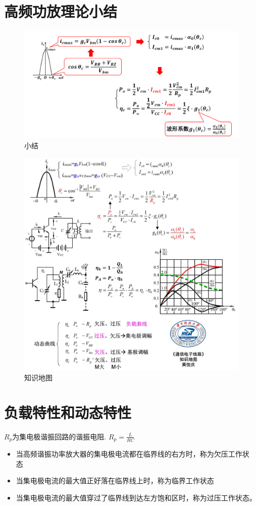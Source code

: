 \documentclass[a4paper]{report}
\begin{document}
\section{高频功放理论小结}
\begin{figure}[H]
\centering
\includegraphics[width=1\textwidth]{power_amp_map_1.png}
\caption{小结}
\end{figure}
\begin{figure}[H]
\centering
\includegraphics[width=1\textwidth]{power_amp_map_2.jpg}
\caption{知识地图}
\end{figure}

\section{负载特性和动态特性}
$R_p$为集电极谐振回路的谐振电阻. $R_p=\frac{L}{RC}$
\begin{itemize}
  \item 当高频谐振功率放大器的集电极电流都在临界线的右方时，称为欠压工作状
  态
  \item 当集电极电流的最大值正好落在临界线上时，称为临界工作状态
  \item 当集电极电流的最大值穿过了临界线到达左方饱和区时，称为过压工作状态。
\end{itemize}
\end{document}
